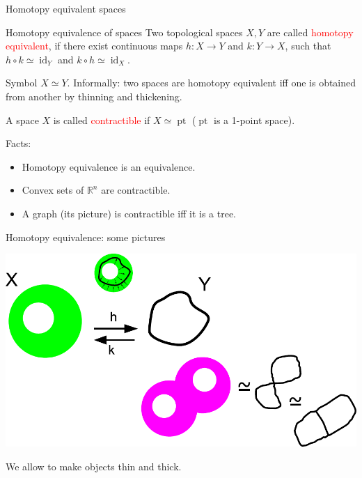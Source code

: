 \documentclass[10pt]{beamer}
\DeclareMathOperator{\pt}{pt}
\DeclareMathOperator{\id}{id}
\newcommand{\Ro}{\mathbb{R}}
\begin{document}
\begin{frame}{Homotopy equivalent spaces}

\begin{block}{Homotopy equivalence of spaces}
Two topological spaces $X,Y$ are called \textcolor{red}{homotopy equivalent}, if there exist continuous maps $h\colon X\to Y$ and $k\colon Y\to X$, such that $h\circ k\simeq \id_Y$ and $k\circ h\simeq \id_X$.
\end{block}

Symbol $X\simeq Y$. \pause Informally: two spaces are homotopy equivalent iff one is obtained from another by thinning and thickening.\pause

A space $X$ is called \textcolor{red}{contractible} if $X\simeq\pt$ ($\pt$ is a 1-point space).\pause

Facts:
\begin{itemize}
  \item Homotopy equivalence is an equivalence.
  \item Convex sets of $\Ro^n$ are contractible.
  \item A graph (its picture) is contractible iff it is a tree.
\end{itemize}

\end{frame}

\begin{frame}{Homotopy equivalence: some pictures}

\begin{center}
\includegraphics[scale = 0.6]{pictures/Homotopy.pdf}
\end{center}

We allow to make objects thin and thick.

\end{frame}
\end{document}
